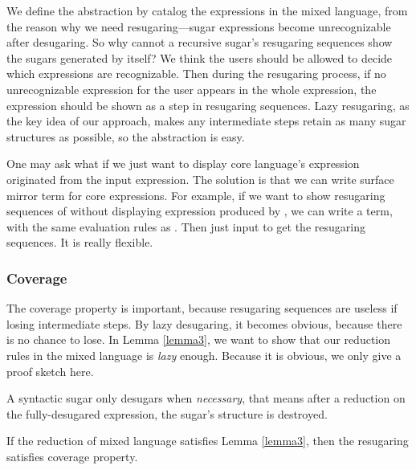We define the abstraction by catalog the expressions in the mixed language, from the reason why we need resugaring---sugar expressions become unrecognizable after desugaring. So why cannot a recursive sugar's resugaring sequences show the sugars generated by itself? We think the users should be allowed to decide which expressions are recognizable. Then during the resugaring process, if no unrecognizable expression for the user appears in the whole expression, the expression should be shown as a step in resugaring sequences. Lazy resugaring, as the key idea of our approach, makes any intermediate steps retain as many sugar structures as possible, so the abstraction is easy.

One may ask what if we just want to display core language's expression originated from the input expression. The solution is that we can write surface mirror term for core expressions. For example, if we want to show resugaring sequences of  without displaying  expression produced by , we can write a  term, with the same evaluation rules as . Then just input  to get the resugaring sequences. It is really flexible.

\subsubsection{Coverage}
The coverage property is important, because resugaring sequences are useless if losing intermediate steps. By lazy desugaring, it becomes obvious, because there is no chance to lose. In Lemma \ref{lemma3}, we want to show that our reduction rules in the mixed language is \emph{lazy} enough. Because it is obvious, we only give a proof sketch here.
\begin{lemma}
\label{lemma3}
A syntactic sugar only desugars when \emph{necessary}, that means after a reduction on the fully-desugared expression, the sugar's structure is destroyed.
\end{lemma}

\begin{Def}[Coverage]
If the reduction of mixed language satisfies Lemma \ref{lemma3}, then the resugaring satisfies coverage property.
\end{Def}



